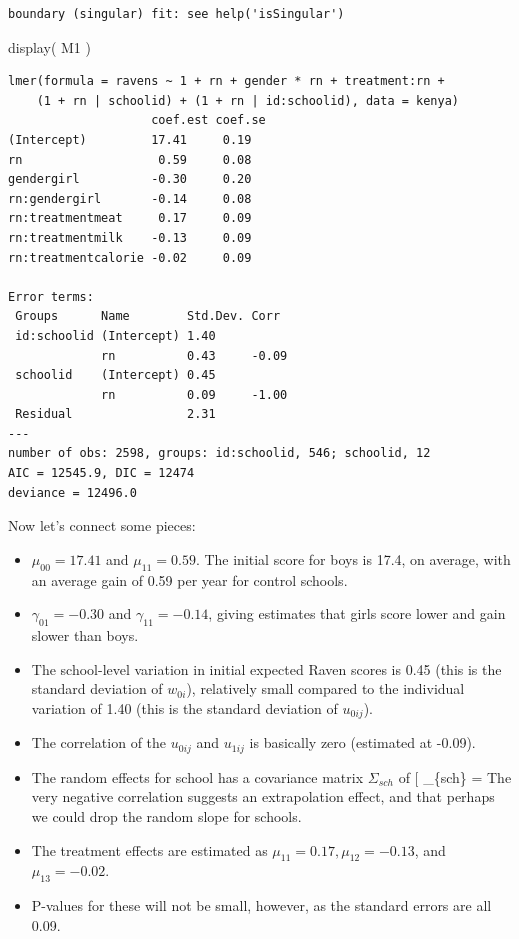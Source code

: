 \documentclass[
  letterpaper,
  DIV=11,
  numbers=noendperiod]{scrreprt}
\newenvironment{Shaded}{}{}
\newcommand{\FunctionTok}[1]{\textcolor[rgb]{0.02,0.16,0.49}{#1}}
\newcommand{\NormalTok}[1]{#1}
\providecommand{\tightlist}{%
  \setlength{\itemsep}{0pt}\setlength{\parskip}{0pt}}\usepackage{longtable,booktabs,array}
\begin{document}
\begin{verbatim}
boundary (singular) fit: see help('isSingular')
\end{verbatim}

\begin{Shaded}
\begin{Highlighting}[]
\FunctionTok{display}\NormalTok{( M1 )}
\end{Highlighting}
\end{Shaded}

\begin{verbatim}
lmer(formula = ravens ~ 1 + rn + gender * rn + treatment:rn + 
    (1 + rn | schoolid) + (1 + rn | id:schoolid), data = kenya)
                    coef.est coef.se
(Intercept)         17.41     0.19  
rn                   0.59     0.08  
gendergirl          -0.30     0.20  
rn:gendergirl       -0.14     0.08  
rn:treatmentmeat     0.17     0.09  
rn:treatmentmilk    -0.13     0.09  
rn:treatmentcalorie -0.02     0.09  

Error terms:
 Groups      Name        Std.Dev. Corr  
 id:schoolid (Intercept) 1.40           
             rn          0.43     -0.09 
 schoolid    (Intercept) 0.45           
             rn          0.09     -1.00 
 Residual                2.31           
---
number of obs: 2598, groups: id:schoolid, 546; schoolid, 12
AIC = 12545.9, DIC = 12474
deviance = 12496.0 
\end{verbatim}

Now let's connect some pieces:

\begin{itemize}
\tightlist
\item
  \(\mu_{00} = 17.41\) and \(\mu_{11} = 0.59\). The initial score for
  boys is 17.4, on average, with an average gain of 0.59 per year for
  control schools.
\item
  \(\gamma_{01} = -0.30\) and \(\gamma_{11} = -0.14\), giving estimates
  that girls score lower and gain slower than boys.
\item
  The school-level variation in initial expected Raven scores is 0.45
  (this is the standard deviation of \(w_{0i}\)), relatively small
  compared to the individual variation of 1.40 (this is the standard
  deviation of \(u_{0ij}\)).
\item
  The correlation of the \(u_{0ij}\) and \(u_{1ij}\) is basically zero
  (estimated at -0.09).
\item
  The random effects for school has a covariance matrix \(\Sigma_{sch}\)
  of {[} \widehat{\Sigma}\_\{sch\} = \left[ 
  \begin{array}{cc}
  0.45^2 & 0.45 \times 0.09 \times -0.99 \\
  . & 0.09^2 
  \end{array} 
  \right] {]} The very negative correlation suggests an extrapolation
  effect, and that perhaps we could drop the random slope for schools.
\item
  The treatment effects are estimated as
  \(\mu_{11}=0.17, \mu_{12}=-0.13\), and \(\mu_{13}=-0.02\).\\
\item
  P-values for these will not be small, however, as the standard errors
  are all 0.09.
\end{itemize}
\end{document}
